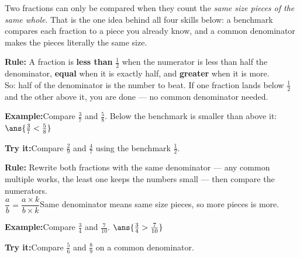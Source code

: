 \documentclass[12pt]{article}
\begin{document}

\noindent\small Two fractions can only be compared when they count the
\emph{same size pieces of the same whole}. That is the one idea behind all four
skills below: a benchmark compares each fraction to a piece you already know,
and a common denominator makes the pieces literally the same size.\normalsize

\begin{formulabox}
\textbf{Rule:} A fraction is \textbf{less than} $\frac{1}{2}$ when the numerator
is less than half the denominator, \textbf{equal} when it is exactly half, and
\textbf{greater} when it is more.\\[3pt]
So: half of the denominator is the number to beat. If one fraction lands below
$\frac{1}{2}$ and the other above it, you are done --- no common denominator
needed.
\end{formulabox}
\begin{examplebox}
\textbf{Example:}\quad Compare $\frac{3}{7}$ and $\frac{5}{8}$.
Below the benchmark is smaller than above it:
$\ans{\frac{3}{7} < \frac{5}{8}}$
\end{examplebox}
\begin{tryitbox}
\textbf{Try it:}\quad Compare $\frac{2}{9}$ and $\frac{4}{7}$ using the
benchmark $\frac{1}{2}$.\\[2pt]
\end{tryitbox}

\begin{formulabox}
\textbf{Rule:} Rewrite both fractions with the same denominator --- any common
multiple works, the least one keeps the numbers small --- then compare the
numerators.\\[3pt]
$\dfrac{a}{b} = \dfrac{a \times k}{b \times k}$\qquad Same denominator means
same size pieces, so more pieces is more.
\end{formulabox}
\begin{examplebox}
\textbf{Example:}\quad Compare $\frac{3}{4}$ and $\frac{7}{10}$.
$\ans{\frac{3}{4} > \frac{7}{10}}$
\end{examplebox}
\begin{tryitbox}
\textbf{Try it:}\quad Compare $\frac{5}{6}$ and $\frac{8}{9}$ on a common
denominator.\\[2pt]
\end{tryitbox}
\end{document}
